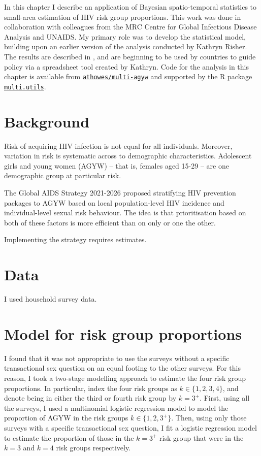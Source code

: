 \documentclass[a4paper, nobind]{templates/ociamthesis}
\begin{document}
In this chapter I describe an application of Bayesian spatio-temporal statistics to small-area estimation of HIV risk group proportions.
This work was done in collaboration with colleagues from the MRC Centre for Global Infectious Disease Analysis and UNAIDS.
My primary role was to develop the statistical model, building upon an earlier version of the analysis conducted by Kathryn Risher.
The results are described in \textcite{howes2023spatio}, and are beginning to be used by countries to guide policy via a spreadsheet tool created by Kathryn.
Code for the analysis in this chapter is available from \href{https://github.com/athowes/multi-agyw}{\texttt{athowes/multi-agyw}} and supported by the R package \href{https://athowes.github.io/multi.utils}{\texttt{multi.utils}}.

\hypertarget{background-2}{%
\section{Background}\label{background-2}}

Risk of acquiring HIV infection is not equal for all individuals.
Moreover, variation in risk is systematic across to demographic characteristics.
Adolescent girls and young women (AGYW) -- that is, females aged 15-29 -- are one demographic group at particular risk.

The Global AIDS Strategy 2021-2026 proposed stratifying HIV prevention packages to AGYW based on local population-level HIV incidence and individual-level sexual risk behaviour.
The idea is that prioritisation based on both of these factors is more efficient than on only or one the other.

Implementing the strategy requires estimates.

\hypertarget{data}{%
\section{Data}\label{data}}

I used household survey data.

\hypertarget{model-for-risk-group-proportions}{%
\section{Model for risk group proportions}\label{model-for-risk-group-proportions}}

I found that it was not appropriate to use the surveys without a specific transactional sex question on an equal footing to the other surveys.
For this reason, I took a two-stage modelling approach to estimate the four risk group proportions.
In particular, index the four risk groups as \(k \in \{1, 2, 3, 4\}\), and denote being in either the third or fourth risk group by \(k = 3^{+}\).
First, using all the surveys, I used a multinomial logistic regression model to model the proportion of AGYW in the risk groups \(k \in \{1, 2, 3^{+}\}\).
Then, using only those surveys with a specific transactional sex question, I fit a logistic regression model to estimate the proportion of those in the \(k = 3^{+}\) risk group that were in the \(k = 3\) and \(k = 4\) risk groups respectively.
\end{document}
